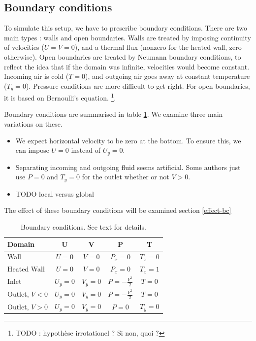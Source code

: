 \documentclass[12pt]{article}
\begin{document}
\subsection{Boundary conditions}
To simulate this setup, we have to prescribe boundary
conditions. There are two main types : walls and open
boundaries. Walls are treated by imposing continuity of velocities ($U
= V = 0$), and a thermal flux (nonzero for the heated wall, zero
otherwise). Open boundaries are treated by Neumann boundary
conditions, to reflect the idea that if the domain was infinite,
velocities would become constant. Incoming air is cold ($T = 0$), and
outgoing air goes away at constant temperature ($T_{y} = 0$). Pressure
conditions are more difficult to get right. For open boundaries, it is
based on Bernoulli's equation. \footnote{TODO : hypoth\`ese
  irrotationel ? Si non, quoi ?}.

Boundary conditions are summarised in table \ref{table:bc}. We examine
three main variations on these.

\begin{itemize}
  \item We expect horizontal velocity to be zero at the bottom. To
    ensure this, we can impose $U = 0$ instead of $U_{y} = 0$.
  \item Separating incoming and outgoing fluid seems artificial. Some
    authors just use $P = 0$ and $T_{y} = 0$ for the outlet whether or
    not $V > 0$.
  \item TODO local versus global
\end{itemize}

The effect of these boundary conditions will be examined section \ref{effect-bc}

\begin{table}[!h]
  \centering
  \begin{tabular}{|l|c|c|c|c|}
    \hline
    Domain & U & V & P & T \\
    \hline
    Wall         & $U = 0$     & $V = 0$     & $P_{x} = 0$             & $T_{x} = 0$ \\
    Heated Wall  & $U = 0$     & $V = 0$     & $P_{x} = 0$             & $T_{x} = 1$ \\
    Inlet           & $U_{y} = 0$ & $V_{y} = 0$ & $P = -\frac{V^{2}}{2}$  & $T = 0$     \\
    Outlet, $V < 0$ & $U_{y} = 0$ & $V_{y} = 0$ & $P = -\frac{V^{2}}{2} $ & $T = 0$     \\
    Outlet, $V > 0$ & $U_{y} = 0$ & $V_{y} = 0$ & $P = 0$                 & $T_y = 0$   \\
    \hline
  \end{tabular}
  \caption{Boundary conditions. See text for details.}
  \label{table:bc}
\end{table}
\end{document}
